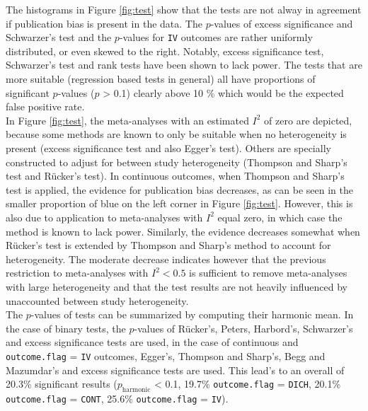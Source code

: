 \documentclass[11pt,a4paper,twoside]{book}\usepackage[]{graphicx}\usepackage[]{color}
\begin{document}
The histograms in Figure \ref{fig:test} show that the tests are not alway in agreement if publication bias is present in the data. The $p$-values of excess significance and Schwarzer's test and the $p$-values for \texttt{IV} outcomes are rather uniformly distributed, or even skewed to the right. Notably, excess significance test, Schwarzer's test and rank tests have been shown to lack power. The tests that are more suitable (regression based tests in general) all have proportions of significant $p$-values ($p$ > 0.1) clearly above 10 \% which would be the expected false positive rate.\\
In Figure \ref{fig:test}, the meta-analyses with an estimated $I^2$ of zero are depicted, because some methods are known to only be suitable when no heterogeneity is present (excess significance test and also Egger's test). Others are specially constructed to adjust for between study heterogeneity (Thompson and Sharp's test and R\"ucker's test). In continuous outcomes, when Thompson and Sharp's test is applied, the evidence for publication bias decreases, as can be seen in the smaller proportion of blue on the left corner in Figure \ref{fig:test}. However, this is also due to application to meta-analyses with $I^2$ equal zero, in which case the method is known to lack power. Similarly, the evidence decreases somewhat when R\"ucker's test is extended by Thompson and Sharp's method to account for heterogeneity. The moderate decrease indicates however that the previous restriction to meta-analyses with $I^2 < 0.5$ is sufficient to remove meta-analyses with large heterogeneity and that the test results are not heavily influenced by unaccounted between study heterogeneity. \\
The $p$-values of tests can be summarized by computing their harmonic mean. In the case of binary tests, the $p$-values of R\"ucker's, Peters, Harbord's, Schwarzer's and excess significance tests are used, in the case of continuous and \texttt{outcome.flag} = \texttt{IV} outcomes, Egger's, Thompson and Sharp's, Begg and Mazumdar's and excess significance tests are used. This lead's to an overall of 20.3\% significant results ($p_\textrm{harmonic}$ < 0.1, 19.7\% \texttt{outcome.flag} = \texttt{DICH}, 20.1\% \texttt{outcome.flag} = \texttt{CONT}, 25.6\% \texttt{outcome.flag} = \texttt{IV}).
\end{document}
